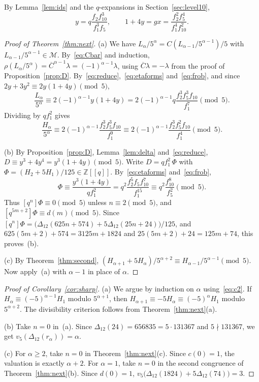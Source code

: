 \documentclass[11pt]{article}
\theoremstyle{definition}
\theoremstyle{remark}
\numberwithin{equation}{section}
\newcommand{\Mod}{\mathscr{M}}
\newcommand{\Cb}{\overline{C}}
\newcommand{\Z}{\mathbb{Z}}
\begin{document}
By Lemma~\ref{lem:ids} and the $q$-expansions in Section~\ref{sec:level10},
\begin{equation}\label{eq:etaforms}
y=q\frac{f_2f_{10}^3}{f_1^3f_5},\qquad 1+4y=gx=\frac{f_2^2f_5^4}{f_1^4f_{10}^2}.
\end{equation}

\begin{proof}[Proof of Theorem~\ref{thm:next}]
(a) We have $L_\alpha/5^\alpha=C(L_{\alpha-1}/5^{\alpha-1})/5$ with $L_{\alpha-1}/5^{\alpha-1}\in\Mod$. By~\eqref{eq:Cbar} and induction, $\rho(L_\alpha/5^\alpha)=\Cb^{\alpha-1}\lambda=(-1)^{\alpha-1}\lambda$, using $\Cb\lambda=-\lambda$ from the proof of Proposition~\ref{prop:D}. By~\eqref{eq:reduce},~\eqref{eq:etaforms} and~\eqref{eq:frob}, and since $2y+3y^2\equiv2y(1+4y)\pmod5$,
\[
\frac{L_\alpha}{5^\alpha}\equiv2(-1)^{\alpha-1}y(1+4y)=2(-1)^{\alpha-1}q\frac{f_2^3f_5^3f_{10}}{f_1^7}\pmod5.
\]
Dividing by $qf_1^2$ gives
\[
\frac{H_\alpha}{5^\alpha}\equiv2(-1)^{\alpha-1}\frac{f_2^3f_5^3f_{10}}{f_1^9}\equiv2(-1)^{\alpha-1}\frac{f_2^3f_5^2f_{10}}{f_1^4}\pmod5.
\]

(b) By Proposition~\ref{prop:D}, Lemma~\ref{lem:delta} and~\eqref{eq:reduce}, $D\equiv y^3+4y^4=y^3(1+4y)\pmod5$. Write $D=qf_1^2\,\Phi$ with $\Phi=(H_2+5H_1)/125\in\Z[[q]]$. By~\eqref{eq:etaforms} and~\eqref{eq:frob},
\[
\Phi\equiv\frac{y^3(1+4y)}{qf_1^2}=q^2\frac{f_2^5f_5f_{10}^7}{f_1^{15}}\equiv q^2\frac{f_{10}^8}{f_5^2}\pmod5.
\]
Thus $[q^n]\Phi\equiv0\pmod5$ unless $n\equiv2\pmod5$, and $[q^{5m+2}]\Phi\equiv d(m)\pmod5$. Since $[q^n]\Phi=\bigl(\Delta_{12}(625n+574)+5\Delta_{12}(25n+24)\bigr)/125$, and $625(5m+2)+574=3125m+1824$ and $25(5m+2)+24=125m+74$, this proves~(b).

(c) By Theorem~\ref{thm:second}, $(H_{\alpha+1}+5H_\alpha)/5^{\alpha+2}\equiv H_{\alpha-1}/5^{\alpha-1}\pmod5$. Now apply~(a) with $\alpha-1$ in place of $\alpha$.
\end{proof}

\begin{proof}[Proof of Corollary~\ref{cor:sharp}]
(a) We argue by induction on $\alpha$ using~\eqref{eq:c2}. If $H_\alpha\equiv(-5)^{\alpha-1}H_1$ modulo $5^{\alpha+1}$, then $H_{\alpha+1}\equiv-5H_\alpha\equiv(-5)^\alpha H_1$ modulo $5^{\alpha+2}$. The divisibility criterion follows from Theorem~\ref{thm:next}(a).

(b) Take $n=0$ in~(a). Since $\Delta_{12}(24)=656835=5\cdot131367$ and $5\nmid131367$, we get $v_5(\Delta_{12}(r_\alpha))=\alpha$.

(c) For $\alpha\ge2$, take $n=0$ in Theorem~\ref{thm:next}(c). Since $c(0)=1$, the valuation is exactly $\alpha+2$. For $\alpha=1$, take $n=0$ in the second congruence of Theorem~\ref{thm:next}(b). Since $d(0)=1$, $v_5\bigl(\Delta_{12}(1824)+5\Delta_{12}(74)\bigr)=3$.
\end{proof}
\end{document}
